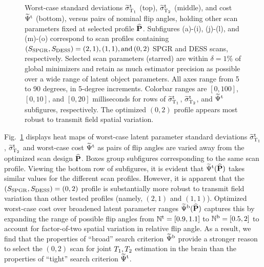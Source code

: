 \begin{sidewaysfigure} [!tbp]
{\begin {minipage} [b] [12.5cm] [b] {0.18\textwidth}
		\end{minipage}	
	}
	\caption{
		Worst-case standard deviations $\widetilde{\sigma}_{\mathrm{T}_1}^\mathrm{t}$ (top), $\widetilde{\sigma}_{\mathrm{T}_2}^\mathrm{t}$ (middle), and cost $\widetilde{\Psi}^{\mathrm{t}}$ (bottom), versus pairs of nominal flip angles, holding other scan parameters fixed at selected profile $\widehat{\mathbf{P}}$. 
		Subfigures (a)-(i), (j)-(l), and (m)-(o) correspond to scan profiles containing $(S_{\mathrm{SPGR}}, S_{\mathrm{DESS}}) = (2,1), (1,1), \text{and}\,(0,2)$ SPGR and DESS scans, respectively. 
		Selected scan parameters (starred) are within $\delta = 1$\% of global minimizers and retain as much estimator precision as possible over a wide range of latent object parameters. 		
		All axes range from 5 to 90 degrees, in 5-degree increments. 
		Colorbar ranges are $[0,100]$, $[0,10]$, and $[0,20]$ milliseconds for rows of $\widetilde{\sigma}_{\mathrm{T}_1}^\mathrm{t}$, $\widetilde{\sigma}_{\mathrm{T}_2}^\mathrm{t}$, and $\widetilde{\Psi}^{\mathrm{t}}$ subfigures, respectively. 
		The optimized $(0,2)$ profile appears most robust to transmit field spatial variation.
	}
	\label{fig:heat,maps}
\end{sidewaysfigure}

Fig.~\ref{fig:heat,maps} displays heat maps 
of worst-case latent parameter standard deviations 
$\widetilde{\sigma}_{\mathrm{T}_1}^\mathrm{t}$, $\widetilde{\sigma}_{\mathrm{T}_2}^\mathrm{t}$ 
and worst-case cost $\widetilde{\Psi}^{\mathrm{t}}$ 
as pairs of flip angles are varied away 
from the optimized scan design $\widehat{\mathbf{P}}$.
Boxes group subfigures corresponding 
to the same scan profile. 
Viewing the bottom row of subfigures, 
it is evident 
that $\widetilde{\Psi}^{\mathrm{t}}(\widehat{\mathbf{P}})$ takes similar values 
for the different scan profiles. 
However, 
it is apparent that the $(S_{\mathrm{SPGR}},S_{\mathrm{DESS}}) = (0,2)$ profile 
is substantially more robust 
to transmit field variation 
than other tested profiles 
(namely, $(2,1)$ and $(1,1)$). 
Optimized worst-case cost 
over broadened latent parameter ranges 
$\widetilde{\Psi}^{\mathrm{b}}(\widehat{\mathbf{P}})$ captures this 
by expanding the range of possible flip angles 
from $\mathbb{N}^\mathrm{t} = [0.9, 1.1]$ to $\mathbb{N}^\mathrm{b} = [0.5, 2]$ 
to account for factor-of-two spatial variation 
in relative flip angle.
As a result, we find that the properties 
of ``broad'' search criterion $\widetilde{\Psi}^{\mathrm{b}}$ 
provide a stronger reason to select the $(0,2)$ scan 
for joint $T_1, T_2$ estimation in the brain 
than the properties 
of ``tight'' search criterion $\widetilde{\Psi}^{\mathrm{t}}$.


